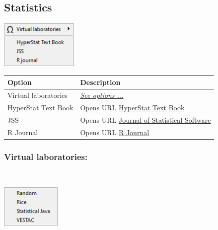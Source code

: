 \hypertarget{menu_web_statistics}{}
\subsection{Statistics}

\includegraphics[scale=0.50]{./res/menu_web_statistics.png}\\

\begin{scriptsize}
  \begin{tabularx}{\textwidth}{>{\hsize=0.5\hsize}X>{\hsize=0.7\hsize}X}\\
    \hline
    \textbf{Option} & \textbf{Description} \\
    \hline
    Virtual laboratories & \textit{\href{\#menu\_web\_statistics\_virtuallabs}{See options ...}} \\
    \hdashline[1pt/1pt]
    HyperStat Text Book & Opens URL \href{http://davidmlane.com/hyperstat/index.html}{HyperStat Text Book} \\
    JSS & Opens URL \href{http://www.jstatsoft.org/}{Journal of Statistical Software} \\
    R Journal & Opens URL \href{http://journal.r-project.org}{R Journal} \\
    \hline
  \end{tabularx}
\end{scriptsize}


\hypertarget{menu_web_statistics_virtuallabs}{}
\subsubsection{Virtual laboratories:}\\

\includegraphics[scale=0.50]{./res/menu_web_statistics_virtuallabs.png}\\

